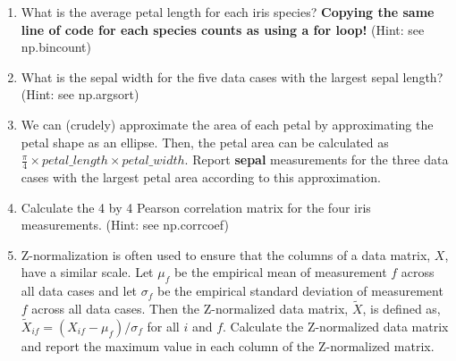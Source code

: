 \documentclass[11pt]{article} %
\begin{document}
\begin{enumerate}
	\item What is the average petal length for each iris species? \textbf{Copying the same line of code for each species counts as using a for loop!} (Hint: see np.bincount)
	\item What is the sepal width for the five data cases with the largest sepal length? (Hint: see np.argsort)
	\item We can (crudely) approximate the area of each petal by approximating the petal shape as an ellipse. Then, the petal area can be calculated as $\frac{\pi}{4}\times petal\_length\times petal\_width$. Report \textbf{sepal} measurements for the three data cases with the largest petal area according to this approximation.
	\item Calculate the 4 by 4 Pearson correlation matrix for the four iris measurements. (Hint: see np.corrcoef)
	\item Z-normalization is often used to ensure that the columns of a data matrix, $X$, have a similar scale. Let $\mu_f$ be the empirical mean of measurement $f$ across all data cases and let $\sigma_f$ be the empirical standard deviation of measurement $f$ across all data cases. Then the Z-normalized data matrix, $\tilde{X}$, is defined as, $\tilde{X}_{if} = (X_{if} - \mu_f)/\sigma_f$ for all $i$ and $f$. Calculate the Z-normalized data matrix and report the maximum value in each column of the Z-normalized matrix.
\end{enumerate}
\end{document}
